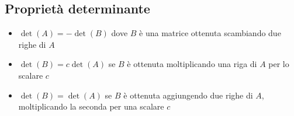 \subsection{Proprietà determinante}
\label{proprietàDet}

\begin{itemize}
	\item $ \det \left( A \right) = - \det \left( B \right)  $ dove $ B $ è una matrice ottenuta scambiando due righe di $ A $
	\item $ \det \left( B \right) = c \det \left( A \right)  $ se $ B $ è ottenuta moltiplicando una riga di $ A $ per lo scalare $ c $
	\item $ \det \left( B \right)  = \det\left( A \right) $ se $ B $ è ottenuta aggiungendo due righe di $ A $, moltiplicando la seconda per una scalare $ c $
	      \hr
\end{itemize}
